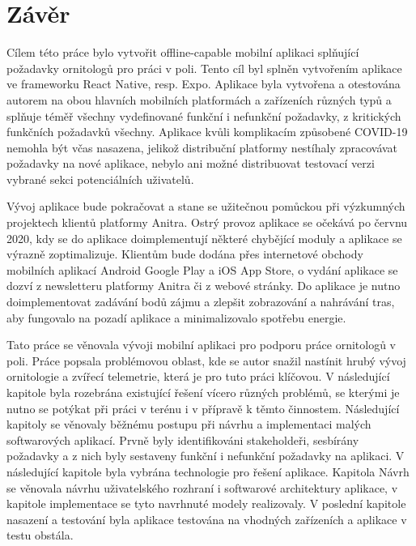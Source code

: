 \chapter*{Závěr}

Cílem této práce bylo vytvořit offline-capable mobilní aplikaci splňující požadavky ornitologů pro práci v poli. Tento cíl byl splněn vytvořením aplikace ve frameworku React Native, resp. Expo. Aplikace byla vytvořena a otestována autorem na obou hlavních mobilních platformách a zařízeních různých typů a splňuje téměř všechny vydefinované funkční i nefunkční požadavky, z kritických funkčních požadavků všechny. Aplikace kvůli komplikacím způsobené COVID-19 nemohla být včas nasazena, jelikož distribuční platformy nestíhaly zpracovávat požadavky na nové aplikace, nebylo ani možné distribuovat testovací verzi vybrané sekci potenciálních uživatelů. 

Vývoj aplikace bude pokračovat a stane se užitečnou pomůckou při výzkumných projektech klientů platformy Anitra. Ostrý provoz aplikace se očekává po červnu 2020, kdy se do aplikace doimplementují některé chybějící moduly a aplikace se výrazně zoptimalizuje. Klientům bude dodána přes internetové obchody mobilních aplikací Android Google Play a iOS App Store, o vydání aplikace se dozví z newsletteru platformy Anitra či z webové stránky. Do aplikace je nutno doimplementovat zadávání bodů zájmu a zlepšit zobrazování a nahrávání tras, aby fungovalo na pozadí aplikace a minimalizovalo spotřebu energie.

Tato práce se věnovala vývoji mobilní aplikaci pro podporu práce ornitologů v poli. Práce popsala problémovou oblast, kde se autor snažil nastínit hrubý vývoj ornitologie a zvířecí telemetrie, která je pro tuto práci klíčovou. V následující kapitole byla rozebrána existující řešení vícero různých problémů, se kterými je nutno se potýkat při práci v terénu i v přípravě k těmto činnostem. Následující kapitoly se věnovaly běžnému postupu při návrhu a implementaci malých softwarových aplikací. Prvně byly identifikováni stakeholdeři, sesbírány požadavky a z nich byly sestaveny funkční i nefunkční požadavky na aplikaci. V následující kapitole byla vybrána technologie pro řešení aplikace. Kapitola Návrh se věnovala návrhu uživatelského rozhraní i softwarové architektury aplikace, v kapitole implementace se tyto navrhnuté modely realizovaly. V poslední kapitole nasazení a testování byla aplikace testována na vhodných zařízeních a aplikace v testu obstála.